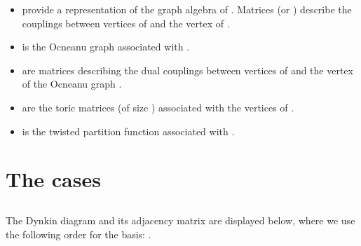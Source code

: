\documentclass[a4paper,11pt]{article}
\let\sect=\section
\def\section{\newpage\sect}
\begin{document}
\begin{itemize}
\item  {}\coordHE{} provide a
representation of the graph algebra of \coordHE{}.
Matrices \coordHE{} (or \coordHE{}) describe the couplings between vertices
\coordHE{} of \coordHE{} and the vertex \coordHE{} of \coordHE{}.



\item  {}\coordHE{} is the Ocneanu graph associated with \coordHE{}.

\item  {}\coordHE{} are matrices describing the dual
couplings between vertices \coordHE{} of \coordHE{}  and the vertex \coordHE{} of
the Ocneanu graph \coordHE{}.

\item  {}\coordHE{} are the toric matrices (of size \coordHE{}) associated with the vertices of \coordHE{}.

\item  {}\coordHE{} is the twisted partition function associated with \coordHE{}.

\end{itemize}



\section{The \coordHE{} cases}


\subsection{\coordHE{}}
The \coordHE{} Dynkin diagram and its adjacency matrix are displayed below,
where we use the following order for the basis: \coordHE{}.
\end{document}
